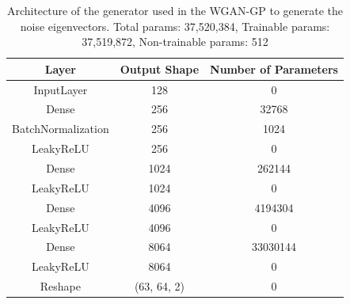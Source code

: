 \documentclass[11pt,a4paper,twoside]{report}
\begin{document}
\begin{table}[]
  \centering
  \begin{tabular}{c c c}
      \hline
      \textbf{Layer} & \textbf{Output Shape} & \textbf{Number of Parameters} \\ \hline
      InputLayer            & 128           & 0                 \\
      Dense                 & 256           & 32768             \\
      BatchNormalization    & 256           & 1024              \\
      LeakyReLU             & 256           & 0                 \\
      Dense                 & 1024          & 262144            \\
      LeakyReLU             & 1024          & 0                 \\
      Dense                 & 4096          & 4194304           \\
      LeakyReLU             & 4096          & 0                 \\
      Dense                 & 8064          & 33030144          \\
      LeakyReLU             & 8064          & 0                 \\
      Reshape               & (63, 64, 2)   & 0                 \\
  \end{tabular}
  \caption{Architecture of the generator used in the WGAN-GP to generate the noise eigenvectors. Total params: 37,520,384, Trainable params: 37,519,872, Non-trainable params: 512}
  \label{tab:noise_evecs_generator_WGANGP_architecture}
\end{table}
\end{document}
